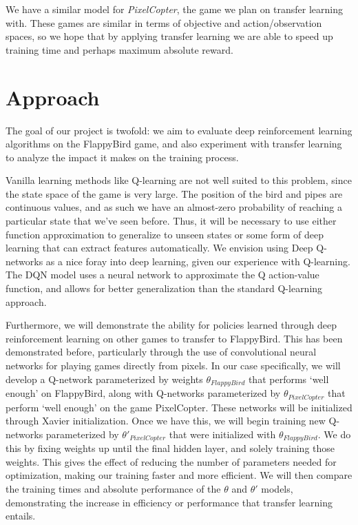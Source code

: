 \documentclass{article}
\begin{document}
We have a similar model for \textit{PixelCopter}, the game we plan on transfer learning with.
These games are similar in terms of objective and action/observation spaces, so we hope that by applying transfer learning we are able to speed up training time and perhaps maximum absolute reward.

\section{Approach}

The goal of our project is twofold: we aim to evaluate deep reinforcement learning algorithms on the FlappyBird game, and also experiment with transfer learning to analyze the impact it makes on the training process. 

Vanilla learning methods like Q-learning are not well suited to this problem, since the state space of the game is very large. The position of the bird and pipes are continuous values, and as such we have an almost-zero probability of reaching a particular state that we've seen before.
Thus, it will be necessary to use either function approximation to generalize to unseen states or some form of deep learning that can extract features automatically.
We envision using Deep Q-networks as a nice foray into deep learning, given our experience with Q-learning.
The DQN model uses a neural network to approximate the Q action-value function, and allows for better generalization than the standard Q-learning approach.

Furthermore, we will demonstrate the ability for policies learned through deep reinforcement learning on  other games to transfer to FlappyBird.
This has been demonstrated before, particularly through the use of convolutional neural networks for playing games directly from pixels. \cite{deepmind}
In our case specifically, we will develop a Q-network parameterized by weights $\theta_{FlappyBird}$ that performs `well enough' on FlappyBird, along with Q-networks parameterized by $\theta_{PixelCopter}$ that perform `well enough' on the game PixelCopter.
These networks will be initialized through Xavier initialization. \cite{xavier}
Once we have this, we will begin training new Q-networks parameterized by $\theta'_{PixelCopter}$ that were initialized with $\theta_{FlappyBird}$.
We do this by fixing weights up until the final hidden layer, and solely training those weights.
This gives the effect of reducing the number of parameters needed for optimization, making our training faster and more efficient.
We will then compare the training times and absolute performance of the $\theta$ and $\theta'$ models, demonstrating the increase in efficiency or performance that transfer learning entails.
\end{document}
